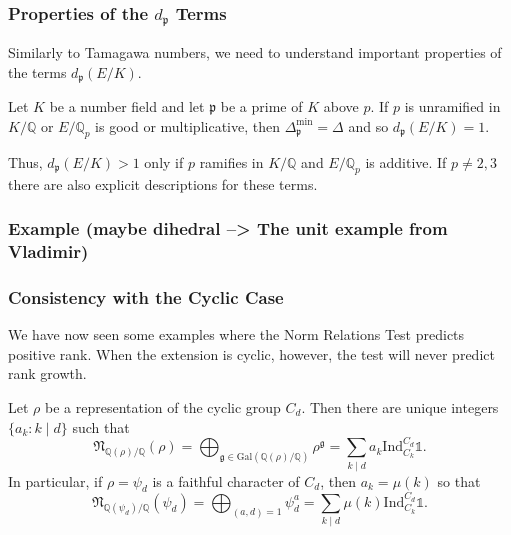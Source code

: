\documentclass{beamer}
\newcommand{\Gal}{\mathrm{Gal}}
\newcommand{\Ind}{\mathrm{Ind}}
\newcommand{\QQ}{\mathbb{Q}}
\newcommand{\pp}{\mathfrak{p}}
\newcommand{\repnorm}[1]{\mathfrak{N}_{\QQ(#1) / \QQ}(#1)}
\theoremstyle{plain}
\begin{document}
\begin{frame}
    \frametitle{Properties of the $d_\pp$ Terms}
    Similarly to Tamagawa numbers, we need to understand important properties of the terms $d_\pp(E/K)$.
    \begin{lemma}
        Let $K$ be a number field and let $\pp$ be a prime of $K$ above $p$. If $p$ is unramified in $K/\QQ$ or $E/\QQ_p$ is good or multiplicative, then $\Delta_\pp^{\min}=\Delta$ and so $d_\pp(E/K)=1$.
    \end{lemma}
    
    Thus, $d_\pp(E/K)>1$ only if $p$ ramifies in $K/\QQ$ and $E/\QQ_p$ is additive. If $p\neq 2,3$ there are also explicit descriptions for these terms.

\end{frame}

\begin{frame}
    \frametitle{Example (maybe dihedral --> The unit example from Vladimir)}
        
\end{frame}



\begin{frame}
    
\end{frame}


\begin{frame}
    \frametitle{Consistency with the Cyclic Case}
    We have now seen some examples where the Norm Relations Test predicts positive rank. When the extension is cyclic, however, the test will never predict rank growth.

    \begin{lemma}
        Let $\rho$ be a representation of the cyclic group $C_d$. Then there are unique integers $\{a_k:k\mid d\}$ such that 
        $$\repnorm{\rho}=\bigoplus_{\mathfrak{g}\in\Gal(\QQ(\rho)/\QQ)}\rho^{\mathfrak{g}}=\sum_{k\mid d}a_k\Ind_{C_k}^{C_d}\mathds{1}.$$
        In particular, if $\rho=\psi_d$ is a faithful character of $C_d$, then $a_k=\mu(k)$ so that
        $$\repnorm{\psi_d}=\bigoplus_{(a,d)=1}\psi_d^a=\sum_{k\mid d}\mu(k)\Ind_{C_k}^{C_d}\mathds{1}.$$
    \end{lemma}

\end{frame}
\end{document}

